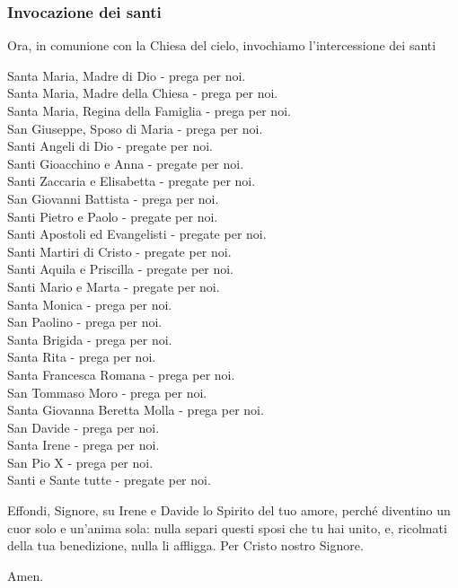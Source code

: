 \subsubsection*{Invocazione dei santi}

	\begin{dialoghi}
	\item[\sacerdotetutti] Ora, in comunione con la Chiesa del cielo, invochiamo l'intercessione dei santi

		Santa Maria, Madre di Dio - {prega per noi.}\\
		Santa Maria, Madre della Chiesa - {prega per noi.}\\
		Santa Maria, Regina della Famiglia - {prega per noi.}\\
		San Giuseppe, Sposo di Maria - {prega per noi.}\\
		Santi Angeli di Dio - {pregate per noi.}\\
		Santi Gioacchino e Anna - {pregate per noi.}\\
		Santi Zaccaria e Elisabetta - {pregate per noi.}\\
		San Giovanni Battista - {prega per noi.}\\
		Santi Pietro e Paolo - {pregate per noi.}\\
		Santi Apostoli ed Evangelisti - {pregate per noi.}\\
		Santi Martiri di Cristo - {pregate per noi.}\\
		Santi Aquila e Priscilla - {pregate per noi.}\\
		Santi Mario e Marta - {pregate per noi.}\\
		Santa Monica - {prega per noi.}\\
		San Paolino - {prega per noi.}\\
		Santa Brigida - {prega per noi.}\\
		Santa Rita - {prega per noi.}\\
		Santa Francesca Romana - {prega per noi.}\\
		San Tommaso Moro - {prega per noi.}\\
		Santa Giovanna Beretta Molla - {prega per noi.}\\
		San Davide - {prega per noi.}\\
		Santa Irene - {prega per noi.}\\
		San Pio X - {prega per noi.}\\
		Santi e Sante tutte - {pregate per noi.}
		\item[\sacerdote] Effondi, Signore, su Irene e Davide lo Spirito del tuo amore, perché diventino un cuor solo e un'anima sola: nulla separi questi sposi che tu hai unito, e, ricolmati della tua benedizione, nulla li affligga. Per Cristo nostro Signore.
		\item[\assemblea] Amen.
	\end{dialoghi}

